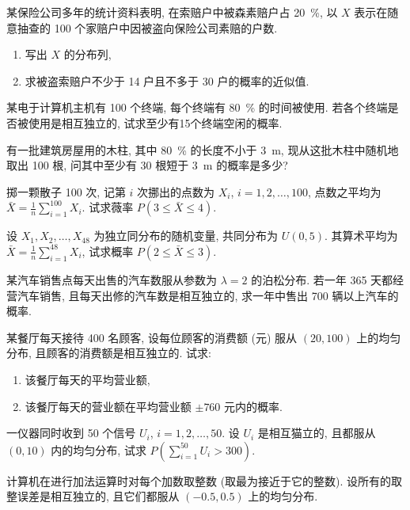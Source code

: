 \begin{xiti}
    \item 某保险公司多年的统计资料表明, 在索赔户中被森素赔户占 \SI{20}{\percent}, 以 $ X $ 表示在随意抽查的 \num{100} 个家赔户中因被盗向保险公司素赔的户数.
    \begin{enumerate}
        \item 写出 $X$ 的分布列,
        \item 求被盗索赔户不少于 14 户且不多于 30 户的概率的近似值.
    \end{enumerate}
    \item 某电于计算机主机有 \num{100} 个终端, 每个终端有 \SI{80}{\percent} 的时间被使用.
    若各个终端是否被使用是相互独立的, 试求至少有15个终端空闲的概率.
    \item 有一批建筑房屋用的木柱, 其中 \SI{80}{\percent} 的长度不小于 \SI{3}{\meter}, 现从这批木柱中随机地取出 \num{100} 根, 问其中至少有 30 根短于 \SI{3}{\meter} 的概率是多少?
    \item 掷一颗散子 100 次, 记第 $ i $ 次挪出的点数为 $ X_i $, $ i = 1, 2, \dotsc, 100 $, 点数之平均为 $ \bar{X} = \frac{1}{n} \sum_{i=1}^{100} X_i $.
    试求薇率 $ P (3 \leq \bar{X} \leq 4 )$.
    \item 设 $ X_1, X_2, \dotsc, X_{48} $ 为独立同分布的随机变量, 共同分布为 $ U (0,5) $.
    其算术平均为 $ \bar{X} = \frac{1}{n} \sum_{i=1}^{48} X_i $, 试求概率 $ P (2 \leq \bar{X} \leq 3) $.
    \item 某汽车销售点每天出售的汽车数服从参数为 $ \lambda = 2 $ 的泊松分布.
    若一年 365 天都经营汽车销售, 且每天出修的汽车数是相互独立的, 求一年中售出 700 辆以上汽车的概率.
    \item 某餐厅每天接待 400 名顾客, 设每位顾客的消费额 (元) 服从 $ (20, 100) $ 上的均匀分布, 且顾客的消费额是相互独立的.
    试求:
    \begin{enumerate}
        \item 该餐厅每天的平均营业额,
        \item 该餐厅每天的营业额在平均营业额 $ \pm 760 $ 元内的概率.
    \end{enumerate}
    \item 一仪器同时收到 50 个信号 $ U_i $, $ i = 1, 2, \dotsc, 50 $.
    设 $ U_i $ 是相互猫立的, 且都服从 $ (0, 10) $ 内的均匀分布, 试求 $ P ( \sum_{i=1}^{50} U_i > 300) $.
    \item 计算机在进行加法运算时对每个加数取整数 (取最为接近于它的整数).
    设所有的取整误差是相互独立的, 且它们都服从 $ (-0.5, 0.5) $ 上的均匀分布.
    \begin{enumerate}

\end{enumerate}
\end{xiti}
